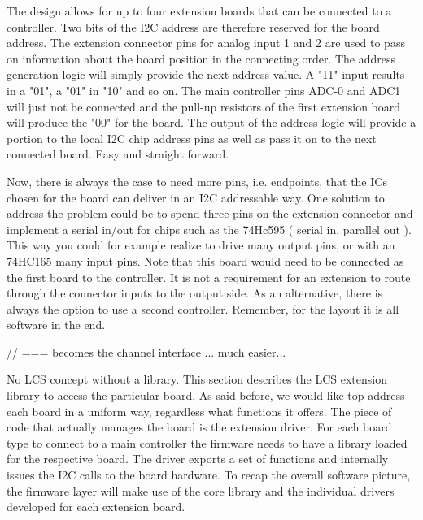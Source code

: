 
The design allows for up to four extension boards that can be connected to a controller. Two bits of the I2C address are therefore reserved for the board address. The extension connector pins for analog input 1 and 2 are used to pass on information about the board position in the connecting order. The address generation logic will simply provide the next address value. A "11" input results in a "01", a "01" in "10" and so on. The main controller pins ADC-0 and ADC1 will just not be connected and the pull-up resistors of the first extension board will produce the "00" for the board. The output of the address logic will provide a portion to the  local I2C chip address pins as well as pass it on to the next connected board. Easy and straight forward.

Now, there is always the case to need more pins, i.e. endpoints, that the ICs chosen for the board can deliver in an I2C addressable way. One solution to address the problem could be to spend three pins on the extension connector and implement a serial in/out for chips such as the 74Hc595 ( serial in, parallel out ). This way you could for example realize to drive many output pins, or with an 74HC165 many input pins. Note that this board would need to be connected as the first board to the controller. It is not a requirement for an extension to route through the connector inputs to the output side. As an alternative, there is always the option to use a second controller. Remember, for the layout it is all software in the end.


// === becomes the channel interface ... much easier...


No LCS concept without a library. This section describes the LCS extension library to access the particular board. As said before, we would like top address each board in a uniform way, regardless what functions it offers. The piece of code that actually manages the board is the extension driver. For each board type to connect to a main controller the firmware needs to have a library loaded for the respective board. The driver exports a set of functions and internally issues the I2C calls to the board hardware. To recap the overall software picture, the firmware layer will make use of the core library and the individual drivers developed for each extension board.

